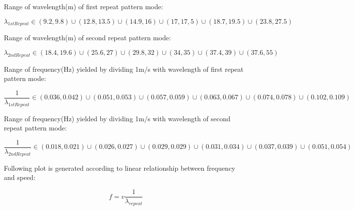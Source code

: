 Range of wavelength(m) of first repeat pattern mode:

$$ \lambda_{1stRepeat} \in (9.2,9.8) \cup (12.8,13.5) \cup (14.9, 16) \cup (17,17,5) \cup (18.7, 19.5) \cup (23.8,27.5)$$

Range of wavelength(m) of second repeat pattern mode:

$$ \lambda_{2ndRepeat} \in (18.4,19.6) \cup (25.6,27) \cup (29.8, 32) \cup (34,35) \cup (37.4, 39) \cup (37.6,55)$$

Range of frequency(Hz) yielded by dividing 1m/s with wavelength of first repeat pattern mode:

$$ \frac{1}{\lambda_{1stRepeat}} \in (0.036,0.042) \cup (0.051,0.053) \cup (0.057,0.059) \cup (0.063,0.067) \cup (0.074,0.078) \cup (0.102,0.109)   $$

Range of frequency(Hz) yielded by dividing 1m/s with wavelength of second repeat pattern mode:

$$ \frac{1}{\lambda_{2ndRepeat}} \in (0.018,0.021) \cup (0.026,0.027) \cup (0.029,0.029) \cup (0.031,0.034) \cup (0.037,0.039) \cup (0.051,0.054)   $$

Following plot is generated according to linear relationship between frequency and speed:

$$ f = v \frac{1}{\lambda_{repeat}} $$

